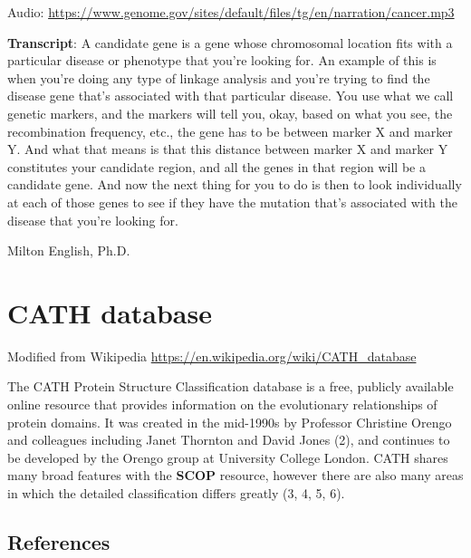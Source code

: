 \documentclass[
]{book}
\begin{document}
Audio: \url{https://www.genome.gov/sites/default/files/tg/en/narration/cancer.mp3}

\textbf{Transcript}: A candidate gene is a gene whose chromosomal location fits with a particular disease or phenotype that you're looking for. An example of this is when you're doing any type of linkage analysis and you're trying to find the disease gene that's associated with that particular disease. You use what we call genetic markers, and the markers will tell you, okay, based on what you see, the recombination frequency, etc., the gene has to be between marker X and marker Y. And what that means is that this distance between marker X and marker Y constitutes your candidate region, and all the genes in that region will be a candidate gene. And now the next thing for you to do is then to look individually at each of those genes to see if they have the mutation that's associated with the disease that you're looking for.

Milton English, Ph.D.

\hypertarget{cath-database}{%
\section{CATH database}\label{cath-database}}

Modified from Wikipedia
\url{https://en.wikipedia.org/wiki/CATH_database}

The CATH Protein Structure Classification database is a free, publicly available online resource that provides information on the evolutionary relationships of protein domains. It was created in the mid-1990s by Professor Christine Orengo and colleagues including Janet Thornton and David Jones (2), and continues to be developed by the Orengo group at University College London. CATH shares many broad features with the \textbf{SCOP} resource, however there are also many areas in which the detailed classification differs greatly (3, 4, 5, 6).

\hypertarget{references}{%
\subsection{References}\label{references}}
\end{document}
